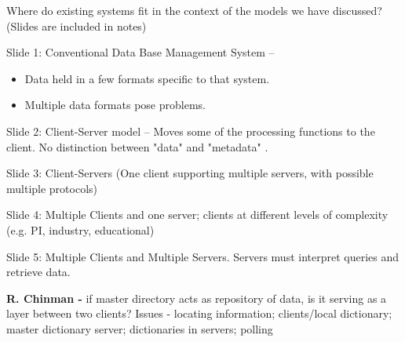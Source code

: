 \medskip
Where do existing systems fit in the context of the models we have discussed?
(Slides are included in notes) 
\begin{description}
	\item{Slide 1:}  Conventional Data Base Management System --

	   \begin{itemize} 
		\item Data held in a few formats specific to that system.
		\item Multiple data formats pose problems.
	   \end{itemize}

\begin{figure}[h]
\centerline{}
\end{figure}

	\item{Slide 2:}  Client-Server model -- Moves some of the processing
functions to the client.  No distinction between "data" and "metadata" . 
\begin{figure}[h]
\centerline{}
\end{figure}
\clearpage

	\item{Slide 3:} Client-Servers  (One client supporting multiple
servers,  with possible multiple protocols) 
\begin{figure}[h]
\centerline{}
\end{figure}
\clearpage

	\item{Slide 4:} Multiple Clients and one server; clients at different
levels of complexity (e.g. PI, industry, educational)
\begin{figure}[h]
\centerline{}
\end{figure}
\clearpage

	\item{Slide 5:} Multiple Clients and Multiple Servers.  Servers must
interpret queries and retrieve data.  
\begin{figure}[h]
\centerline{}
\end{figure}


\smallskip
{\bf R. Chinman -} if master directory acts as repository of data, is it
serving as a  layer between two clients?   
Issues - locating information; clients/local dictionary; master dictionary 
server; dictionaries in servers; polling


\end{description}
